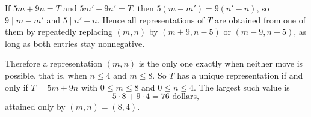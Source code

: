 If $5m+9n=T$ and $5m'+9n'=T$, then $5(m-m')=9(n'-n)$, so $9\mid m-m'$ and $5\mid n'-n$. Hence all representations of $T$ are obtained from one of them by repeatedly replacing $(m,n)$ by $(m+9,n-5)$ or $(m-9,n+5)$, as long as both entries stay nonnegative.

Therefore a representation $(m,n)$ is the only one exactly when neither move is possible, that is, when $n\le 4$ and $m\le 8$. So $T$ has a unique representation if and only if $T=5m+9n$ with $0\le m\le 8$ and $0\le n\le 4$. The largest such value is
\[
5\cdot 8+9\cdot 4=\boxed{76}\text{ dollars},
\]
attained only by $(m,n)=(8,4)$.
